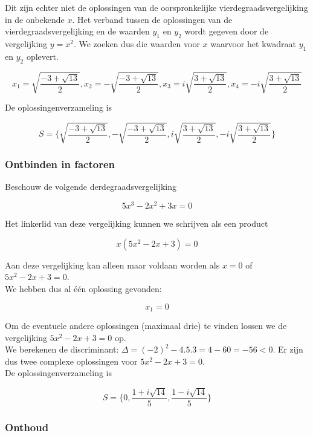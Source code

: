 Dit zijn echter niet de oplossingen van de oorspronkelijke vierdegraadsvergelijking in de onbekende $x$. Het verband tussen de oplossingen van de vierdegraadsvergelijking en de waarden $y_{1}$ en $y_{2}$ wordt gegeven door de vergelijking $y=x^2$. We zoeken dus die waarden voor $x$ waarvoor het kwadraat $y_{1}$ en $y_{2}$ oplevert.

\[ x_{1}=\sqrt{\frac{-3 + \sqrt{13}}{2}} , x_{2}=-\sqrt{\frac{-3 + \sqrt{13}}{2}} , x_{3}=i\sqrt{\frac{3 + \sqrt{13}}{2}} , x_{4}=-i\sqrt{\frac{3 + \sqrt{13}}{2}}     \]

De oplossingenverzameling is

\[ S=\{ \sqrt{\frac{-3 + \sqrt{13}}{2}} , -\sqrt{\frac{-3 + \sqrt{13}}{2}} , i\sqrt{\frac{3 + \sqrt{13}}{2}} , -i\sqrt{\frac{3 + \sqrt{13}}{2}}  \} \]

\subsubsection{Ontbinden in factoren}

Beschouw de volgende derdegraadsvergelijking

\[ 5x^3-2x^2+3x = 0\]

Het linkerlid van deze vergelijking kunnen we schrijven als een product

\[ x(5x^2-2x+3)=0 \]

Aan deze vergelijking kan alleen maar voldaan worden als $x=0$ of $5x^2-2x+3=0$.\\
We hebben dus al \'{e}\'{e}n oplossing gevonden:

\[ x_{1}=0 \]

Om de eventuele andere oplossingen (maximaal drie) te vinden lossen we de vergelijking $5x^2-2x+3=0$ op.\\ We berekenen de discriminant: $\Delta = (-2)^2 - 4.5.3=4-60=-56 <0$. Er zijn dus twee complexe oplossingen voor $5x^2-2x+3=0$.\\

De oplossingenverzameling is

\[ S=\{ 0 , \frac{1+i\sqrt{14}}{5} , \frac{1-i\sqrt{14}}{5} \} \]

\subsubsection{Onthoud}

